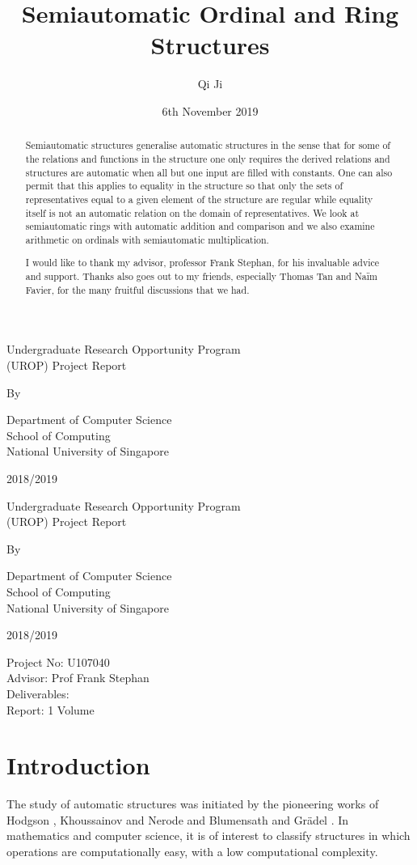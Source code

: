 \documentclass[british,a4paper,11pt,abstract=on]{scrreprt}
\title{Semiautomatic Ordinal and Ring Structures}
\author{Qi Ji}
\date{6th November 2019}
\makeatletter
\let\thetitle\@title
\let\theauthor\@author
\theoremstyle{definition}
\theoremstyle{remark}
\newcommand{\makecoverpage}{
    \begin{center}
        \singlespacing
        Undergraduate Research Opportunity Program \\
        (UROP) Project Report
        \vspace*{2cm}

        \doublespacing
        {\Large \textbf{\thetitle}}
        \vspace*{2cm}

        By \\
        \theauthor

        \vspace*{2cm}
        Department of Computer Science \\
        School of Computing \\
        National University of Singapore

        \vspace*{2cm}
        2018/2019
    \end{center}
}
\newenvironment{acknowledgements}{\renewcommand\abstractname{Acknowledgements}\begin{abstract}} {\end{abstract}}
\makeatother
\begin{document}
\let\setminus\smallsetminus
\let\epsilon\varepsilon
\begin{titlepage}
    \makecoverpage
\end{titlepage}
\begin{titlepage}
    \makecoverpage
    \vspace*{3cm}

    \noindent
    Project No: U107040 \\
    Advisor: Prof Frank Stephan \\
    Deliverables: \\
    Report: 1 Volume
\end{titlepage}

\begin{abstract}
    Semiautomatic structures generalise automatic structures in the sense that for some of the relations and functions in the structure one only requires the derived relations and structures are automatic when all but one input are filled with constants.
    One can also permit that this applies to equality in the structure so that only the sets of representatives equal to a given element of the structure are regular while equality itself is not an automatic relation on the domain of representatives.
    We look at semiautomatic rings with automatic addition and comparison
    and we also examine arithmetic on ordinals with semiautomatic multiplication.
\end{abstract}

\begin{acknowledgements}
    I would like to thank my advisor, professor Frank Stephan, for his invaluable advice and support.
    Thanks also goes out to my friends, especially Thomas Tan and Na\"im Favier, for the many fruitful discussions that we had.
\end{acknowledgements}

\tableofcontents

\chapter{Introduction}

The study of automatic structures was initiated by the pioneering works of
Hodgson \autocite{Ho76, Ho83}, Khoussainov and Nerode \autocite{KN} and Blumensath and Grädel \autocite{BG00}.
In mathematics and computer science, it is of interest to classify structures in which operations are computationally easy, with a low computational complexity.
\end{document}
